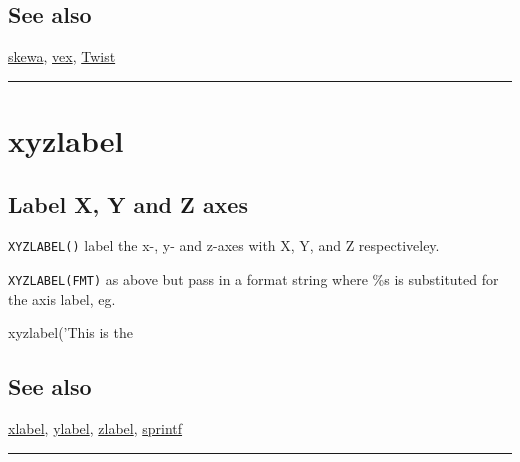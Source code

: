 \subsection*{See also}


\hyperlink{skewa}{\color{blue} skewa}, \hyperlink{vex}{\color{blue} vex}, \hyperlink{Twist}{\color{blue} Twist}

\vspace{1.5ex}\rule{\textwidth}{1mm}

\hypertarget{xyzlabel}{\section*{xyzlabel}}
\subsection*{Label X, Y and Z axes}


\texttt{XYZLABEL()} label the x-, y- and z-axes with \textquotesingle X\textquotesingle , \textquotesingle Y\textquotesingle , and \textquotesingle Z\textquotesingle 
respectiveley.



\texttt{XYZLABEL(FMT)} as above but pass in a format string where \%s is substituted
for the axis label, eg.

\begin{Code}
    xyzlabel('This is the %

\end{Code}

\subsection*{See also}


\hyperlink{xlabel}{\color{blue} xlabel}, \hyperlink{ylabel}{\color{blue} ylabel}, \hyperlink{zlabel}{\color{blue} zlabel}, \hyperlink{sprintf}{\color{blue} sprintf}

\vspace{1.5ex}\rule{\textwidth}{1mm}
